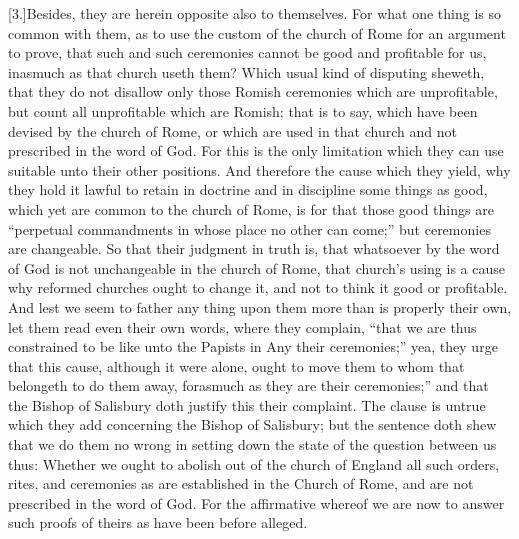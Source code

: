 [3.]Besides, they are herein opposite also to themselves. For what one thing is so common with them, as to use the custom of the church of Rome for an argument to prove, that such and such ceremonies cannot be good and profitable for us, inasmuch as that church useth them? Which usual kind of disputing sheweth, that they do not disallow only those Romish ceremonies which are unprofitable, but count all unprofitable which are Romish; that is to say, which have been devised by the church of Rome, or which are used in that church and not prescribed in the word of God. For this is the only limitation which they can use suitable unto their other positions. And therefore the cause which they yield, why they hold it lawful to retain in doctrine and in discipline some things as good, which yet are common to the church of Rome, is for that those good things are “perpetual commandments in whose place no other can come;” but ceremonies are changeable. So that their judgment in truth is, that whatsoever by the word of God is not unchangeable in the church of Rome, that church’s using is a cause why reformed churches ought to change it, and not to think it good or profitable. And lest we seem to father any thing upon them more than is properly their own, let them read even their own words, where they complain, “that we are thus constrained to be like unto the Papists in Any their ceremonies;” yea, they urge that this cause, although it were alone, ought to move them to whom that belongeth to do them away, forasmuch as they are their ceremonies;” and that the Bishop of Salisbury doth justify this their complaint.  The clause is untrue which they add concerning the Bishop of Salisbury; but the sentence doth shew that we do them no wrong in setting down the state of the question between us thus: Whether we ought to abolish out of the church of England all such orders, rites, and ceremonies as are established in the Church of Rome, and are not prescribed in the word of God. For the affirmative whereof we are now to answer such proofs of theirs as have been before alleged.


